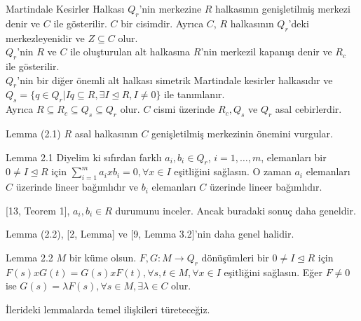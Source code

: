 \documentclass{beamer}
\begin{document}
\begin{frame}

\begin{block}{Martindale Kesirler Halkası}
$Q_r$'nin merkezine $R$ halkasının genişletilmiş merkezi denir ve $C$ ile gösterilir. $C$ bir cisimdir. Ayrıca $C$, $R$ halkasının $Q_r$'deki merkezleyenidir ve $Z \subseteq C$ olur.\\
$Q_r$'nin $R$ ve $C$ ile oluşturulan alt halkasına $R$'nin merkezil kapanışı denir ve $R_c$ ile gösterilir.\\
$Q_r$'nin bir diğer önemli alt halkası simetrik Martindale kesirler halkasıdır ve $Q_s = \{q \in Q_r | Iq \subseteq R, \exists I \trianglelefteq R, I \neq 0\}$ ile tanımlanır.\\
Ayrıca $R \subseteq R_c \subseteq Q_s \subseteq Q_r$ olur.
$C$ cismi üzerinde $R_c, Q_s$ ve $Q_r$ asal cebirlerdir.
\end{block}

Lemma (2.1) $R$ asal halkasının $C$ genişletilmiş merkezinin önemini vurgular.
    
\end{frame}

\begin{frame}

\begin{block}{Lemma 2.1}
Diyelim ki sıfırdan farklı $a_i, b_i \in Q_r$, $i = 1, \dots, m$, elemanları bir $0 \neq I \trianglelefteq R$ için $\displaystyle\sum_{i = 1}^{m}{a_ixb_i} = 0, \forall x \in I$ eşitliğini sağlasın. O zaman $a_i$ elemanları $C$ üzerinde lineer bağımlıdır ve $b_i$ elemanları $C$ üzerinde lineer bağımlıdır.
\end{block}

[13, Teorem 1], $a_i, b_i \in R$ durumunu inceler. Ancak buradaki sonuç daha geneldir.

\end{frame}

\begin{frame}

Lemma (2.2), [2, Lemma] ve [9, Lemma 3.2]'nin daha genel halidir.

\begin{block}{Lemma 2.2}
$M$ bir küme olsun. $F, G \colon M \to Q_r$ dönüşümleri bir $0 \neq I \trianglelefteq R$ için $F(s)xG(t) = G(s)xF(t), \forall s,t \in M, \forall x \in I$ eşitliğini sağlasın. Eğer $F \neq 0$ ise $G(s) = \lambda F(s), \forall s \in M, \exists \lambda \in C$ olur.
\end{block}

İlerideki lemmalarda temel ilişkileri türeteceğiz.

\end{frame}
\end{document}
